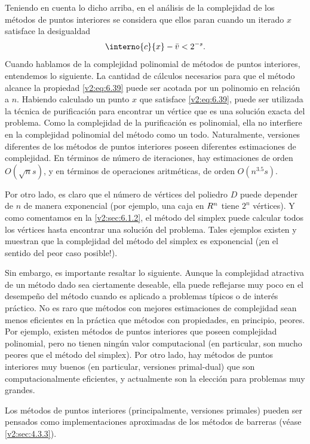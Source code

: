 Teniendo en cuenta lo dicho arriba, en el análisis de la complejidad de los métodos de puntos interiores se considera que ellos paran cuando un iterado $x$ satisface la desigualdad
\begin{equation}
    \interno{c}{x} - \bar{v} < 2^{-s}.
    \label{v2:eq:6.39}
\end{equation}
Cuando hablamos de la complejidad polinomial de métodos de puntos interiores, entendemos lo siguiente. La cantidad de cálculos necesarios para que el método alcance la propiedad \eqref{v2:eq:6.39} puede ser acotada por un polinomio en relación a $n$. Habiendo calculado un punto $x$ que satisface \eqref{v2:eq:6.39}, puede ser utilizada la técnica de purificación para encontrar un vértice que es una solución exacta del problema. Como la complejidad de la purificación es polinomial, ella no interfiere en la complejidad polinomial del método como un todo. Naturalmente, versiones diferentes de los métodos de puntos interiores poseen diferentes estimaciones de complejidad. En términos de número de iteraciones, hay estimaciones de orden $O(\sqrt{n} s)$, y en términos de operaciones aritméticas, de orden $O(n^{3.5} s)$.

Por otro lado, es claro que el número de vértices del poliedro $D$ puede depender de $n$ de manera exponencial (por ejemplo, una caja en $R^n$ tiene $2^n$ vértices). Y como comentamos en la \cref{v2:sec:6.1.2}, el método del simplex puede calcular todos los vértices hasta encontrar una solución del problema. Tales ejemplos existen y muestran que la complejidad del método del simplex es exponencial (¡en el sentido del peor caso posible!).

Sin embargo, es importante resaltar lo siguiente. Aunque la complejidad atractiva de un método dado sea ciertamente deseable, ella puede reflejarse muy poco en el desempeño del método cuando es aplicado a problemas típicos o de interés práctico. No es raro que métodos con mejores estimaciones de complejidad sean menos eficientes en la práctica que métodos con propiedades, en principio, peores. Por ejemplo, existen métodos de puntos interiores que poseen complejidad polinomial, pero no tienen ningún valor computacional (en particular, son mucho peores que el método del simplex). Por otro lado, hay métodos de puntos interiores muy buenos (en particular, versiones primal-dual) que son computacionalmente eficientes, y actualmente son la elección para problemas muy grandes.

Los métodos de puntos interiores (principalmente, versiones primales) pueden ser pensados como implementaciones aproximadas de los métodos de barreras (véase \cref{v2:sec:4.3.3}).

